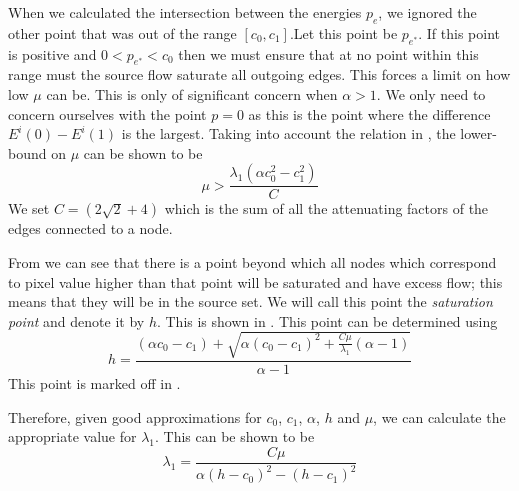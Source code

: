 \documentclass[10pt, journal, letterpaper, onecolumn, draftcls]{IEEEtran}
\begin{document}
When we calculated the intersection between the energies $p_e$, we ignored the other point that was out of the range $[c_0, c_1]$.Let this point be $p_{e^*}$. If this point is positive and $0<p_{e^*}<c_0$ then we must ensure that at no point within this range must the source flow saturate all outgoing edges. This forces a limit on how low $\mu$ can be. This is only of significant concern when $\alpha>1$. We only need to concern ourselves with the point $p=0$ as this is the point where the difference $E^i(0)-E^i(1)$ is the largest. Taking into account the relation in , the lower-bound on $\mu$ can be shown to be 
\begin{equation}
	\mu > \frac{\lambda_1(\alpha c_0^2-c_1^2)}{C}
	\label{eq:mulowerbound}
\end{equation}
We set $C=\left( 2\sqrt{2} + 4\right)$ which is the sum of all the attenuating factors of the edges connected to a node.

From  we can see that there is a point beyond which all nodes which correspond to pixel value higher than that point will be saturated and have excess flow; this means that they will be in the source set. We will call this point the \textit{saturation point} and denote it by $h$. This is shown in . This point can be determined using
\begin{equation}
	h = \frac{(\alpha c_0-c_1)+\sqrt{\alpha(c_0-c_1)^2+\frac{C\mu}{\lambda_1}(\alpha-1)}}{\alpha-1}
	\label{eq:h}
\end{equation}
This point is marked off in .

Therefore, given good approximations for $c_0$, $c_1$, $\alpha$, $h$ and $\mu$, we can calculate the appropriate value for $\lambda_1$. This can be shown to be
\begin{equation}
	\lambda_1 = \frac{C\mu}{\alpha(h-c_0)^2-(h-c_1)^2}
	\label{eq:lambda1approximation}
\end{equation}
\end{document}
